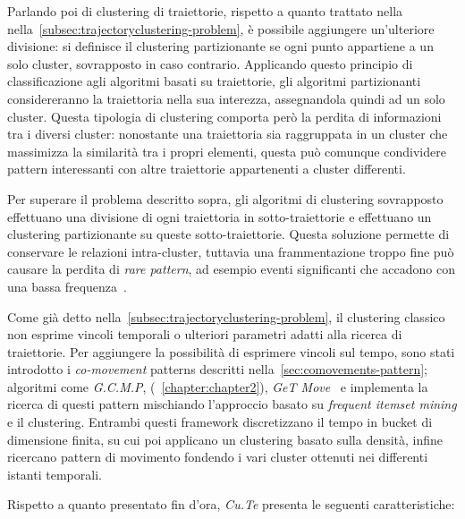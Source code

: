 Parlando poi di clustering di traiettorie, rispetto a quanto trattato nella nella~\cref{subsec:trajectoryclustering-problem}, è possibile aggiungere un'ulteriore divisione:
si definisce il clustering partizionante se ogni punto appartiene a un solo cluster, sovrapposto in caso contrario.
Applicando questo principio di classificazione agli algoritmi basati su traiettorie, gli algoritmi partizionanti considereranno la traiettoria nella sua interezza,
assegnandola quindi ad un solo cluster. Questa tipologia di clustering comporta però la perdita di informazioni tra i diversi cluster:
nonostante una traiettoria sia raggruppata in un cluster che massimizza la similarità tra i propri elementi,
questa può comunque condividere pattern interessanti con altre traiettorie appartenenti a cluster differenti.

Per superare il problema descritto sopra, gli algoritmi di clustering sovrapposto effettuano una divisione di ogni traiettoria
in sotto-traiettorie e effettuano un clustering partizionante su queste sotto-traiettorie.
Questa soluzione permette di conservare le relazioni intra-cluster, tuttavia una frammentazione troppo fine può causare
la perdita di \textit{rare pattern}, ad esempio eventi significanti che accadono con una bassa frequenza~\cite{DBLP:journals/tkdd/KohR16, DBLP:journals/geoinformatica/HuangPX06}.

Come già detto nella~\cref{subsec:trajectoryclustering-problem}, il clustering classico non esprime vincoli temporali o ulteriori parametri adatti alla ricerca di traiettorie.
Per aggiungere la possibilità di esprimere vincoli sul tempo, sono stati introdotto i \textit{co-movement} patterns descritti nella~\cref{sec:comovements-pattern}; algoritmi come \textit{G.C.M.P},
(~\cref{chapter:chapter2}), \textit{GeT Move}~\cite{DBLP:journals/ijitdm/PhanPT16} e  implementa la ricerca di questi pattern mischiando l'approccio basato su \textit{frequent itemset mining} e il clustering.
Entrambi questi framework discretizzano il tempo in bucket di dimensione finita, su cui poi applicano un clustering basato sulla densità, infine
ricercano pattern di movimento fondendo i vari cluster ottenuti nei differenti istanti temporali.

Rispetto a quanto presentato fin d'ora, \textit{Cu.Te} presenta le seguenti caratteristiche:

